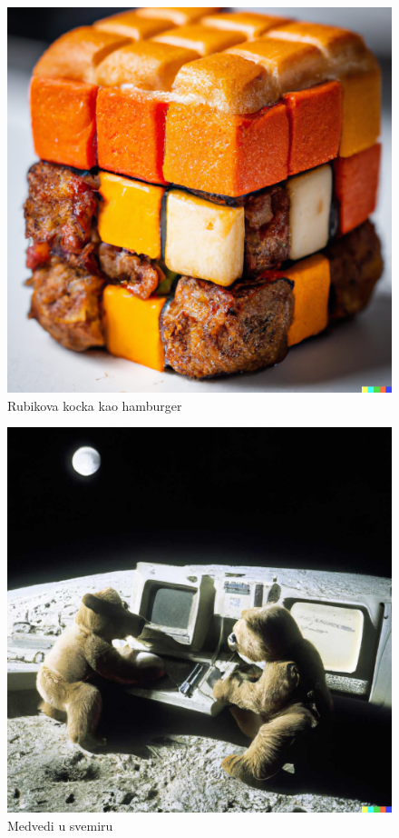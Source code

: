 \documentclass[a4paper]{article}
\begin{document}
\begin{nesto1}
\begin{figure}[h!]
\begin{center}
\includegraphics[scale=0.10]{hamburger.jpg}
\end{center}
\caption{Rubikova kocka kao hamburger}
\label{fig:hamburger}
\end{figure}

\begin{figure}[h!]
\begin{center}
\includegraphics[scale=0.10]{medvedi.jpg}
\end{center}
\caption{Medvedi u svemiru}
\label{fig:medvedi}
\end{figure}


\end{nesto1}
\newpage
\end{document}

